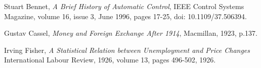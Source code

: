 \begin{thebibliography}{9}

% 
% 
% 
% 
% 

    Stuart Bennet,
    \emph{A Brief History of Automatic Control},
    IEEE Control Systems Magazine,
    volume 16,
    issue 3,
    June 1996,
    pages 17-25,
    doi: 10.1109/37.506394.

    Gustav Cassel,
    \emph{Money and Foreign Exchange After 1914},
    Macmillan,
    1923,
    p.137.

% 
% 


    Irving Fisher, 
    \emph{A Statistical Relation between Unemployment and Price Changes}
    International Labour Review,
    1926,
    volume 13,
    pages 496-502,
    1926.


\end{thebibliography}
